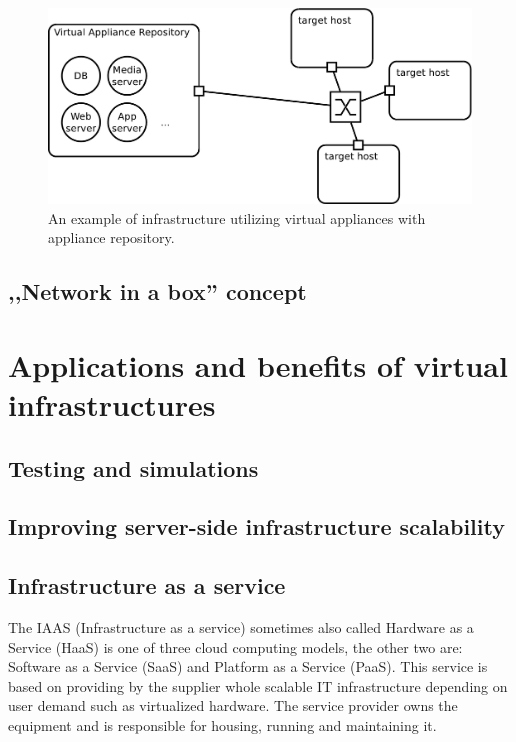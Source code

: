 \documentclass[11pt]{book}
\begin{document}
        \begin{figure}[H]
          \begin{center}
            \includegraphics[width=.7\textwidth]{img/solaris/virtual-appliance-infra.pdf}
          \end{center}

          \caption{An example of infrastructure utilizing virtual appliances with appliance repository.}
        \end{figure}


      \subsection{,,Network in a box'' concept}



    \section{Applications and benefits of virtual infrastructures}

      \subsection{Testing and simulations}

      \subsection{Improving server-side infrastructure scalability}

      \subsection{Infrastructure as a service}

        The IAAS (Infrastructure as a service) sometimes also called Hardware as a Service (HaaS) is one of three cloud
        computing models, the other two are: Software as a Service (SaaS) and Platform as a Service (PaaS).  This
        service is based on providing by the supplier whole scalable IT infrastructure depending on user demand such as
        virtualized hardware. The service provider owns the equipment and is responsible for housing, running and
        maintaining it.
\end{document}
